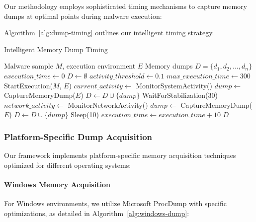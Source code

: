 Our methodology employs sophisticated timing mechanisms to capture memory dumps at optimal points during malware execution:

Algorithm~\ref{alg:dump-timing} outlines our intelligent timing strategy.

\begin{algorithm}[!htbp]
\caption{Intelligent Memory Dump Timing}
\label{alg:dump-timing}
\begin{algorithmic}[1]
\Require Malware sample $M$, execution environment $E$
\Ensure Memory dumps $D = \{d_1, d_2, ..., d_n\}$
\State $execution\_time \leftarrow 0$
\State $D \leftarrow \emptyset$
\State $activity\_threshold \leftarrow 0.1$
\State $max\_execution\_time \leftarrow 300$ 
\State StartExecution($M$, $E$)
    \State $current\_activity \leftarrow$ MonitorSystemActivity()
        \State $dump \leftarrow$ CaptureMemoryDump($E$)
        \State $D \leftarrow D \cup \{dump\}$
        \State WaitForStabilization(30) 
    \EndIf
    \State $network\_activity \leftarrow$ MonitorNetworkActivity()
        \State $dump \leftarrow$ CaptureMemoryDump($E$)
        \State $D \leftarrow D \cup \{dump\}$
    \EndIf
    \State Sleep(10) 
    \State $execution\_time \leftarrow execution\_time + 10$
\EndWhile
\Return $D$
\end{algorithmic}
\end{algorithm}

\subsubsection{Platform-Specific Dump Acquisition}

Our framework implements platform-specific memory acquisition techniques optimized for different operating systems:

\paragraph{Windows Memory Acquisition}

For Windows environments, we utilize Microsoft ProcDump with specific optimizations, as detailed in Algorithm~\ref{alg:windows-dump}:


